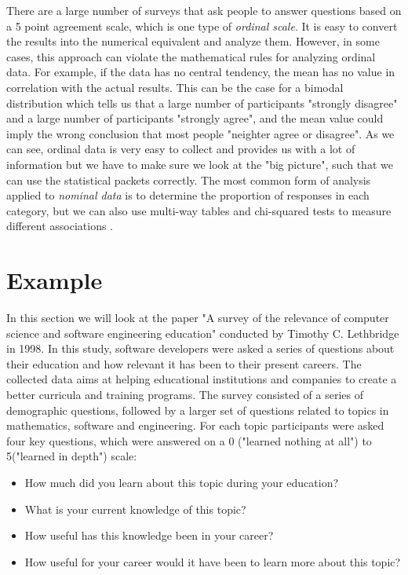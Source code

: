 \documentclass{report}
\begin{document}
There are a large number of surveys that ask people to answer questions based on a 5 point agreement scale, which is one type of \textit{ordinal scale}. It is easy to convert the results into the numerical equivalent and analyze them. However, in some cases, this approach can violate the mathematical rules for analyzing ordinal data. For example, if the data has no central tendency, the mean has no value in correlation with the actual results. This can be the case for a bimodal distribution which tells us that a large number of participants "strongly disagree" and a large number of participants "strongly agree", and the mean value could imply the wrong conclusion that most people "neighter agree or disagree". As we can see, ordinal data is very easy to collect and provides us with a lot of information but we have to make sure we look at the "big picture", such that we can use the statistical packets correctly. The most common form of analysis applied to \textit{nominal data} is to determine the proportion of responses in each category, but we can also use multi-way tables and chi-squared tests to measure different associations \cite{Kitchenham6}.

\section{Example}
In this section we will look at the paper "A survey of the relevance of computer science and software engineering education" conducted by Timothy C. Lethbridge in 1998. In this study, software developers were asked a series of questions about their education and how relevant it has been to their present careers. The collected data aims at helping educational institutions and companies to create a better curricula and training programs. The survey consisted of a series of demographic questions, followed by a larger set of questions related to topics in mathematics, software and engineering. For each topic participants were asked four key questions, which were answered on a 0 ("learned nothing at all") to 5("learned in depth") scale: 
\begin{itemize}
\item How much did you learn about this topic during your education?\\
\item What is your current knowledge of this topic?\\
\item How useful has this knowledge been in your career?\\
\item How useful for your career would it have been to learn more about this topic?\\
\end{itemize}
\end{document}
